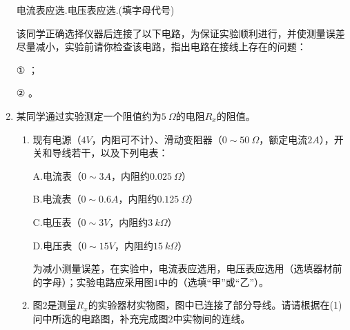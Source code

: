 \begin{enumerate}[leftmargin=0em]
电流表应选.电压表应选.(填字母代号)

该同学正确选择仪器后连接了以下电路，为保证实验顺利进行，并使测量误差尽量减小，实验前请你检查该电路，指出电路在接线上存在的问题：

\begin{minipage}[h!]{0.6\linewidth}
\vspace{0.3em}
① \hfullline ；

② \hfullline 。
\vspace{0.3em}
\end{minipage}
\hfill
\begin{minipage}[h!]{0.4\linewidth}
\flushright
\vspace{0.3em}

\vspace{0.3em}
\end{minipage}


\newpage
\item 
{}
某同学通过实验测定一个阻值约为$ 5 \ \Omega $的电阻$ R_x $的阻值。

\begin{enumerate}
\renewcommand{\labelenumi}{\arabic{enumi}.}
\item
现有电源（$ 4V $，内阻可不计）、滑动变阻器（$ 0 \sim 50 \ \Omega $，额定电流$ 2A $），开关和导线若干，以及下列电表：

A.电流表（$ 0 \sim 3A $，内阻约$ 0.025 \ \Omega $）

B.电流表（$ 0 \sim 0.6A $，内阻约$ 0.125 \ \Omega $）

C.电压表（$ 0 \sim 3V $，内阻约$ 3 \ k\Omega $）

D.电压表（$ 0 \sim 15V $，内阻约$ 15 \ k\Omega $）

为减小测量误差，在实验中，电流表应选用，电压表应选用（选填器材前的字母）；实验电路应采用图$ 1 $中的（选填“甲”或“乙”）。
\begin{figure}[h!]
\centering

\end{figure}

\item 
图$ 2 $是测量$ R_x $的实验器材实物图，图中已连接了部分导线。请请根据在(1)问中所选的电路图，补充完成图$ 2 $中实物间的连线。
\begin{figure}[h!]
\centering

\end{figure}



\end{enumerate}
\end{enumerate}
